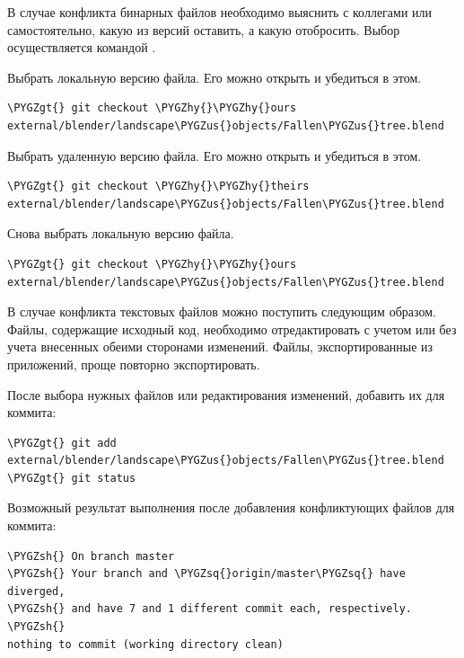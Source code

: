 \documentclass[a4paper,12pt,oneside]{sphinxmanual}
\def\PYGZus{\char`\_}
\def\PYGZgt{\char`\>}
\def\PYGZsh{\char`\#}
\def\PYGZhy{\char`\-}
\def\PYGZsq{\char`\'}
\begin{document}
В случае конфликта бинарных файлов необходимо выяснить с коллегами или самостоятельно, какую из версий оставить, а какую отобросить. Выбор осуществляется командой .

Выбрать локальную версию файла. Его можно открыть и убедиться в этом.

\begin{Verbatim}[commandchars=\\\{\}]
\PYGZgt{} git checkout \PYGZhy{}\PYGZhy{}ours external/blender/landscape\PYGZus{}objects/Fallen\PYGZus{}tree.blend
\end{Verbatim}

Выбрать удаленную версию файла. Его можно открыть и убедиться в этом.

\begin{Verbatim}[commandchars=\\\{\}]
\PYGZgt{} git checkout \PYGZhy{}\PYGZhy{}theirs external/blender/landscape\PYGZus{}objects/Fallen\PYGZus{}tree.blend
\end{Verbatim}

Снова выбрать локальную версию файла.

\begin{Verbatim}[commandchars=\\\{\}]
\PYGZgt{} git checkout \PYGZhy{}\PYGZhy{}ours external/blender/landscape\PYGZus{}objects/Fallen\PYGZus{}tree.blend
\end{Verbatim}

В случае конфликта текстовых файлов можно поступить следующим образом. Файлы, содержащие исходный код, необходимо отредактировать с учетом или без учета внесенных обеими сторонами изменений. Файлы, экспортированные из приложений, проще повторно экспортировать.

После выбора нужных файлов или редактирования изменений, добавить их для коммита:

\begin{Verbatim}[commandchars=\\\{\}]
\PYGZgt{} git add external/blender/landscape\PYGZus{}objects/Fallen\PYGZus{}tree.blend
\PYGZgt{} git status
\end{Verbatim}

Возможный результат выполнения  после добавления конфликтующих файлов для коммита:

\begin{Verbatim}[commandchars=\\\{\}]
\PYGZsh{} On branch master
\PYGZsh{} Your branch and \PYGZsq{}origin/master\PYGZsq{} have diverged,
\PYGZsh{} and have 7 and 1 different commit each, respectively.
\PYGZsh{}
nothing to commit (working directory clean)
\end{Verbatim}
\end{document}
